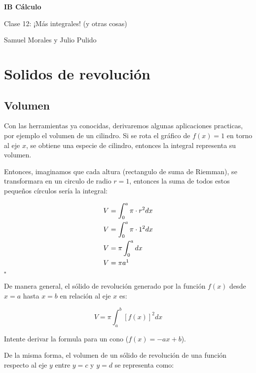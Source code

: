\documentclass[spanish,12pt]{article}
\begin{document}
	\begin{titlepage}
	\begin{center}
	\hspace{0pt}
	\vfill
	{\Large\textbf{{IB Cálculo}}}
	
	\medskip
	Clase 12: ¡Más integrales! (y otras cosas)
	
	\medskip
    Samuel Morales y Julio Pulido
	
	\thispagestyle{empty}
	\vfill
	\end{center}
	\end{titlepage}
\newpage
\tableofcontents
\newpage
\section{Solidos de revolución}
\subsection{Volumen}
    
    Con las herramientas ya conocidas, derivaremos algunas aplicaciones practicas, por ejemplo el volumen de un cilindro. Si se rota el gráfico de $f(x)=1$ en torno al eje $x$, se obtiene una especie de cilindro, entonces la integral representa su volumen.
    
    Entonces, imaginamos que cada altura (rectangulo de suma de Riemman), se transformara en un circulo de radio $r=1$, entonces la suma de todos estos pequeños círculos sería la integral:
    
    \begin{align*}
        V&=\int_0^a\pi\cdot r^2dx\\
        V&=\int_0^a\pi\cdot 1^2dx\\
        V&=\pi\int_0^adx\\
        V&=\pi a\footnotemark
    \end{align*}
    \hfill $\square$
    
    De manera general, el sólido de revolución generado por la función $f(x)$ desde $x=a$ hasta $x=b$ en relación al eje $x$ es:
    
    $$V=\pi\int_a^b [f(x)]^2dx$$
    
    Intente derivar la formula para un cono ($f(x)=-ax+b$).
    
    De la misma forma, el volumen de un sólido de revolución de una función respecto al eje $y$ entre $y=c$ y $y=d$ se representa como:
    
\end{document}
